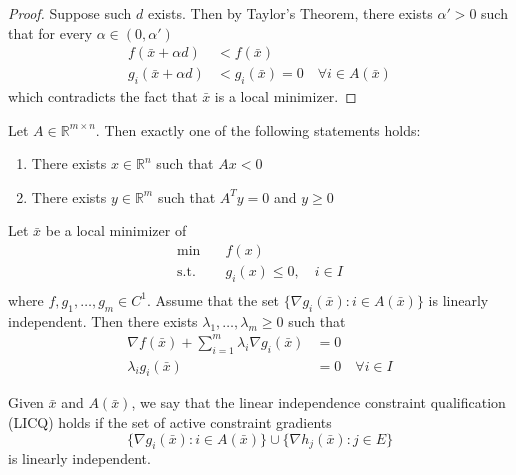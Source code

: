 \begin{proof}[Proof]
    Suppose such $d$ exists. Then by Taylor's Theorem, there exists $\alpha' > 0$ such that for every $\alpha \in (0, \alpha')$
    \begin{align*}
        f(\bar x + \alpha d) &< f(\bar x) \tag*{and} \\
        g_i(\bar x + \alpha d) &< g_i(\bar x) = 0 \quad \forall i \in A(\bar x) 
    \end{align*}
    which contradicts the fact that $\bar x$ is a local minimizer.
\end{proof}
\begin{lemma}
    Let $A \in \mathbb R^{m \times n}$. Then exactly one of the following statements holds:
    \begin{enumerate}
        \item There exists $x \in \mathbb R^n$ such that $Ax < 0$
        \item There exists $y \in \mathbb R^m$ such that $A^Ty = 0$ and $y \geq 0$
    \end{enumerate}
\end{lemma}
\begin{theorem}[]
    Let $\bar x$ be a local minimizer of 
    \begin{align*}
        \min \quad & f(x) \\
        \text{s.t.} \quad & g_i(x) \leq 0, \quad i \in I \\
    \end{align*}
    where $f, g_1,\ldots,g_m \in C^1$. Assume that the set $\{\nabla g_i(\bar x): i \in A(\bar x)\}$ is linearly independent. Then there exists $\lambda_1,\ldots,\lambda_m \geq 0$ such that
    \begin{align*}
        \nabla f(\bar x) + \sum^m_{i=1} \lambda_i \nabla g_i(\bar x) &= 0 \\
        \lambda_i g_i(\bar x) &= 0 \quad \forall i \in I
    \end{align*}
\end{theorem}
\begin{definition}[LICQ]
    Given $\bar x$ and $A(\bar x)$, we say that the linear independence constraint qualification (LICQ) holds if the set of active constraint gradients
    $$\{\nabla g_i(\bar x): i \in A(\bar x)\} \cup \{\nabla h_j(\bar x): j \in E\}$$ is linearly independent.
\end{definition}


